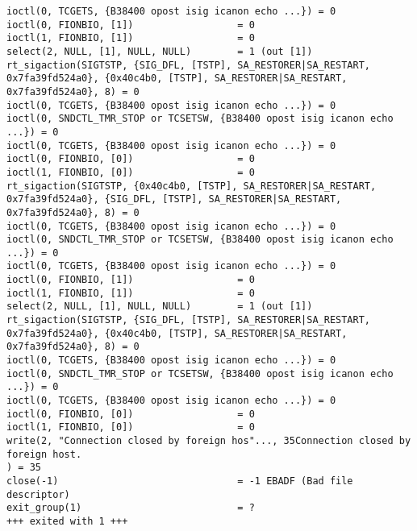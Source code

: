 \begin{lstlisting}[caption=Telnet成功時(手動),label=lst:telnet-success,linebackgroundcolor={\ifnum\value{lstnumber}>22 \ifnum\value{lstnumber}<29\color{green!30}\fi\fi}]
ioctl(0, TCGETS, {B38400 opost isig icanon echo ...}) = 0
ioctl(0, FIONBIO, [1])                  = 0
ioctl(1, FIONBIO, [1])                  = 0
select(2, NULL, [1], NULL, NULL)        = 1 (out [1])
rt_sigaction(SIGTSTP, {SIG_DFL, [TSTP], SA_RESTORER|SA_RESTART, 0x7fa39fd524a0}, {0x40c4b0, [TSTP], SA_RESTORER|SA_RESTART, 0x7fa39fd524a0}, 8) = 0
ioctl(0, TCGETS, {B38400 opost isig icanon echo ...}) = 0
ioctl(0, SNDCTL_TMR_STOP or TCSETSW, {B38400 opost isig icanon echo ...}) = 0
ioctl(0, TCGETS, {B38400 opost isig icanon echo ...}) = 0
ioctl(0, FIONBIO, [0])                  = 0
ioctl(1, FIONBIO, [0])                  = 0
rt_sigaction(SIGTSTP, {0x40c4b0, [TSTP], SA_RESTORER|SA_RESTART, 0x7fa39fd524a0}, {SIG_DFL, [TSTP], SA_RESTORER|SA_RESTART, 0x7fa39fd524a0}, 8) = 0
ioctl(0, TCGETS, {B38400 opost isig icanon echo ...}) = 0
ioctl(0, SNDCTL_TMR_STOP or TCSETSW, {B38400 opost isig icanon echo ...}) = 0
ioctl(0, TCGETS, {B38400 opost isig icanon echo ...}) = 0
ioctl(0, FIONBIO, [1])                  = 0
ioctl(1, FIONBIO, [1])                  = 0
select(2, NULL, [1], NULL, NULL)        = 1 (out [1])
rt_sigaction(SIGTSTP, {SIG_DFL, [TSTP], SA_RESTORER|SA_RESTART, 0x7fa39fd524a0}, {0x40c4b0, [TSTP], SA_RESTORER|SA_RESTART, 0x7fa39fd524a0}, 8) = 0
ioctl(0, TCGETS, {B38400 opost isig icanon echo ...}) = 0
ioctl(0, SNDCTL_TMR_STOP or TCSETSW, {B38400 opost isig icanon echo ...}) = 0
ioctl(0, TCGETS, {B38400 opost isig icanon echo ...}) = 0
ioctl(0, FIONBIO, [0])                  = 0
ioctl(1, FIONBIO, [0])                  = 0
write(2, "Connection closed by foreign hos"..., 35Connection closed by foreign host.
) = 35
close(-1)                               = -1 EBADF (Bad file descriptor)
exit_group(1)                           = ?
+++ exited with 1 +++
\end{lstlisting}

